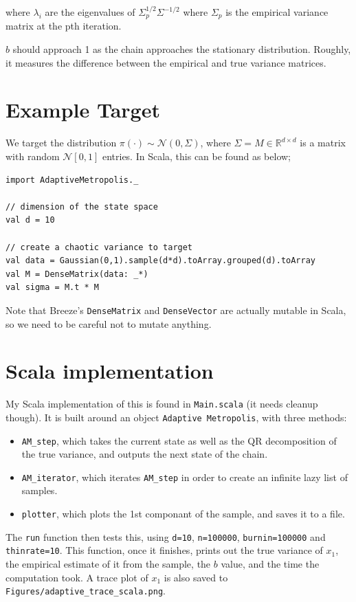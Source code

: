 \documentclass[letterpaper]{article}
\begin{document}
where \(\lambda_i\) are the eigenvalues of \(\Sigma_p^{1/2}\Sigma^{-1/2}\) where \(\Sigma_p\) is the empirical variance matrix at the pth iteration.

\(b\) should approach 1 as the chain approaches the stationary distribution. Roughly, it measures the difference between the empirical and true variance matrices.
\section{Example Target}
\label{sec:org431c4d0}

We target the distribution \(\pi(\cdot)\sim \mathcal N(0,\Sigma)\), where \(\Sigma = M \in \mathbb R^{d\times d}\) is a matrix with random \(\mathcal N[0,1]\) entries. In Scala, this can be found as below;

\begin{verbatim}
import AdaptiveMetropolis._

// dimension of the state space
val d = 10

// create a chaotic variance to target
val data = Gaussian(0,1).sample(d*d).toArray.grouped(d).toArray
val M = DenseMatrix(data: _*)
val sigma = M.t * M
\end{verbatim}

Note that Breeze's \texttt{DenseMatrix} and \texttt{DenseVector} are actually mutable in Scala, so we need to be careful not to mutate anything.
\section{Scala implementation}
\label{sec:org48646bb}

My Scala implementation of this is found in \texttt{Main.scala} (it needs cleanup though). It is built around an object \texttt{Adaptive Metropolis}, with three methods:

\begin{itemize}
\item \texttt{AM\_step}, which takes the current state as well as the QR decomposition of the true variance, and outputs the next state of the chain.
\item \texttt{AM\_iterator}, which iterates \texttt{AM\_step} in order to create an infinite lazy list of samples.
\item \texttt{plotter}, which plots the 1st componant of the sample, and saves it to a file.
\end{itemize}


The \texttt{run} function then tests this, using \texttt{d=10}, \texttt{n=100000}, \texttt{burnin=100000} and \texttt{thinrate=10}. This function, once it finishes, prints out the true variance of \(x_1\), the empirical estimate of it from the sample, the \(b\) value, and the time the computation took. A trace plot of \(x_1\) is also saved to \texttt{Figures/adaptive\_trace\_scala.png}.
\end{document}
